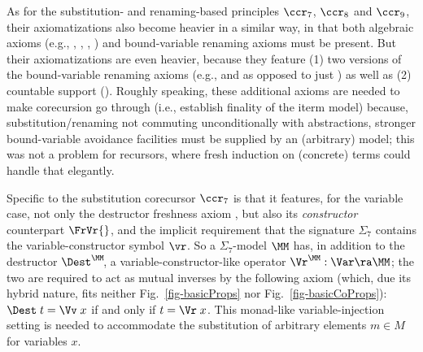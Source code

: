 As for the substitution- and renaming-based principles $\ccr_{7}$, $\ccr_8$ and $\ccr_9$, their axiomatizations also become heavier in a similar way,  
in that both algebraic axioms (e.g., \IRnId{}, \IRnIm{}, \IRnCh{}, \IRnCm{}) and bound-variable renaming axioms must be present. But their axiomatizations are even heavier, because they feature (1) 
two versions of the bound-variable renaming axioms (e.g., \IRnBvr{} and \IIRnBvr{} as opposed to just \IRnBvr{}) as well as (2) countable support (\IFSupFr{}). Roughly speaking, these additional axioms are needed to make corecursion go through (i.e., establish finality of the iterm model) because,  substitution/renaming not commuting unconditionally with abstractions, stronger %
bound-variable avoidance facilities must be supplied by an (arbitrary) model; 
this was not %
a problem for recursors, where fresh induction on (concrete) terms could handle that elegantly. %
%
%
%

Specific to the substitution %
corecursor $\ccr_7$ is that it features, for the variable case, not only 
the destructor freshness axiom \IFrVr{}, but also its \emph{constructor} counterpart $\FrVr{}$, %
and the implicit requirement that the signature $\Sigma_7$ contains the variable-constructor symbol $\vr$. So a $\Sigma_7$-model $\MM$ has, in addition to the destructor $\Dest^\MM\!$, a variable-constructor-like operator $\Vr^\MM : \Var \ra \MM$; the two are required to act as mutual inverses by the following axiom \VrInv{} (which, due its %
hybrid nature, fits neither Fig.~\ref{fig-basicProps} nor Fig.~\ref{fig-basicCoProps}): 
$\Dest\;t = \Vv\;x$ if and only if $t = \Vr\;x$. 
%
This monad-like
variable-injection setting is needed to accommodate %
the substitution of arbitrary elements $m\in M$ for variables $x$. %

